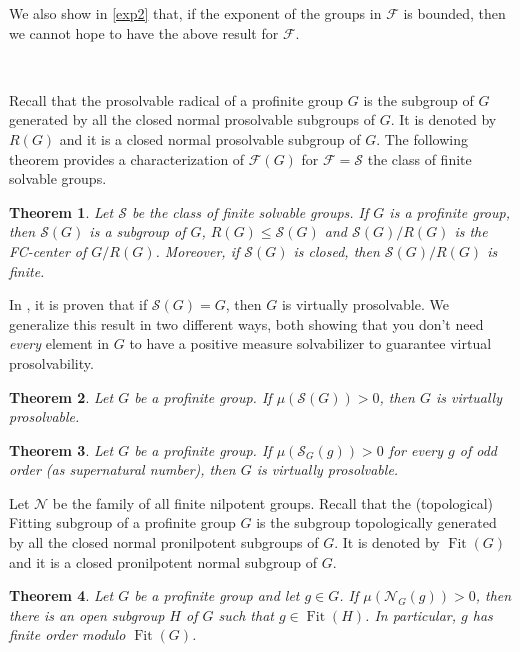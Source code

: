 \documentclass{amsart}
\DeclareMathOperator{\fit}{Fit}
\newtheorem{thm}{Theorem}
\numberwithin{equation}{section}
\begin{document}
We also show in \cref{exp2} that, if the exponent of the groups in $\mathcal{F}$ is bounded, then we cannot hope to have the above result for $\mathcal{F}$.

\

Recall that the prosolvable radical of a profinite group $G$ is the subgroup of $G$ generated by all the closed normal prosolvable subgroups of $G$. It is denoted by $R(G)$ and it is a closed normal prosolvable subgroup of $G$. The following theorem provides a characterization of $\mathcal F(G)$ for $\mathcal F = \mathcal S$ the class of finite solvable groups.


\begin{thm}\label{descs}
Let $\mathcal{S}$ be the class of finite solvable groups. If $G$ is a profinite group, then $\mathcal{S}(G)$ is a subgroup of $G$, $R(G) \leq \mathcal{S}(G)$ and $\mathcal{S}(G)/R(G)$ is the FC-center of $G/R(G)$. Moreover, if $\mathcal S(G)$ is closed, then $\mathcal S(G)/R(G)$ is finite.
\end{thm}





In \cite{aemp}, it is proven that if $\mathcal S(G) = G$, then $G$ is virtually prosolvable. We generalize this result in two different ways, both showing that you don't need \emph{every} element in $G$ to have a positive measure solvabilizer to guarantee virtual prosolvability.

\begin{thm}\label{musolpos} Let $G$ be a profinite group. If $\mu(\mathcal S(G)) > 0$, then $G$ is virtually prosolvable.
\end{thm}

\begin{thm}\label{thodd}
 Let $G$ be a profinite group. If $\mu(\mathcal S_G(g)) > 0$ for every $g$ of odd order (as supernatural number), then $G$ is virtually prosolvable. 
\end{thm}



Let $\mathcal{N}$ be the family of all finite nilpotent groups. Recall that the {(topological)} Fitting subgroup of a profinite group $G$ is the subgroup topologically generated by all the closed normal pronilpotent subgroups of $G$. It is denoted by $\fit(G)$ and it is a closed pronilpotent normal subgroup of $G$.

\begin{thm}\label{nilpp}
Let $G$ be a profinite group and let $g \in G$. If $\mu(\mathcal{N}_G(g)) > 0$, then there is an open subgroup $H$ of $G$ such that $g \in \fit(H)$. In particular, $g$ has finite order modulo $\fit(G)$.
\end{thm}
\end{document}
